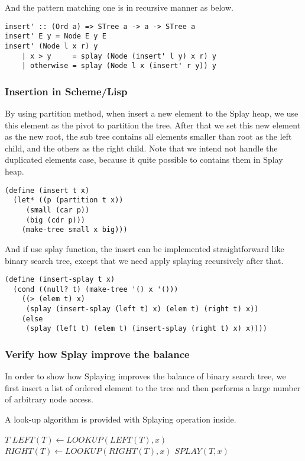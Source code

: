 \documentclass{article}
\begin{document}
And the pattern matching one is in recursive manner as below.

\begin{lstlisting}
insert' :: (Ord a) => STree a -> a -> STree a
insert' E y = Node E y E
insert' (Node l x r) y
    | x > y     = splay (Node (insert' l y) x r) y
    | otherwise = splay (Node l x (insert' r y)) y
\end{lstlisting}

\subsubsection*{Insertion in Scheme/Lisp}

By using partition method, when insert a new element to the Splay
heap, we use this element as the pivot to partition the tree.
After that we set this new element as the new root, the sub tree
contains all elements smaller than root as the left child, and
the others as the right child. Note that we intend not handle the
duplicated elements case, because it quite possible to contains
them in Splay heap.

\lstset{language=lisp}
\begin{lstlisting}
(define (insert t x)
  (let* ((p (partition t x))
	 (small (car p))
	 (big (cdr p)))
    (make-tree small x big)))
\end{lstlisting}

And if use splay function, the insert can be implemented straightforward
like binary search tree, except that we need apply splaying recursively
after that.

\begin{lstlisting}
(define (insert-splay t x)
  (cond ((null? t) (make-tree '() x '()))
	((> (elem t) x)
	 (splay (insert-splay (left t) x) (elem t) (right t) x))
	(else
	 (splay (left t) (elem t) (insert-splay (right t) x) x))))
\end{lstlisting}

\subsubsection{Verify how Splay improve the balance}
In order to show how Splaying improves the balance of binary search
tree, we first insert a list of ordered element to the tree and then
performs a large number of arbitrary node access.

A look-up algorithm is provided with Splaying operation inside.

\begin{algorithmic}[1]
    \State \Return $T$
    \State $LEFT(T) \gets LOOKUP(LEFT(T), x)$
  \Else
    \State $RIGHT(T) \gets LOOKUP(RIGHT(T), x)$
  \EndIf
  \State \Return $SPLAY(T, x)$
\EndFunction
\end{algorithmic}
\end{document}
